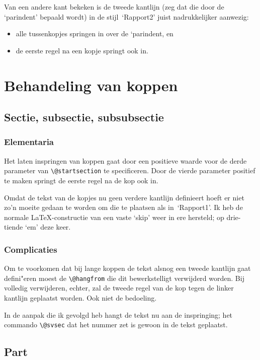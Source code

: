 \documentclass[oldtoc,a4paper,10pt]{rapport3}
\begin{document}
Van een andere kant bekeken is de tweede kantlijn (zeg dat die door de
`parindent' bepaald wordt) in de stijl~`Rapport2' juist nadrukkelijker
aanwezig:
\begin{itemize}
\item alle tussenkopjes springen in over de `parindent, en
\item de eerste regel na een kopje springt ook in.
\end{itemize}
 
 
\section{Behandeling van koppen}
\subsection{Sectie, subsectie, subsubsectie}
\subsubsection{Elementaria}
 
Het laten inspringen van koppen gaat door een positieve waarde voor de
derde parameter van \verb.\@startsection.  te specificeren. Door de
vierde parameter positief te maken springt de eerste regel na de kop
ook in.
 
Omdat de tekst van de kopjes nu geen verdere kantlijn definieert hoeft
er niet zo'n moeite gedaan te worden om die te plaatsen als
in~`Rapport1'. Ik heb de normale \LaTeX-constructie van een vaste
`skip' weer in ere hersteld; op drie-tiende `em' deze keer.
 
\subsubsection{Complicaties}
 
Om te voorkomen dat bij lange koppen de tekst alsnog een tweede
kantlijn gaat defini"eren moest de \verb.\@hangfrom. die dit
bewerkstelligt verwijderd worden. Bij volledig verwijderen, echter,
zal de tweede regel van de kop tegen de linker kantlijn geplaatst
worden.  Ook niet de bedoeling.
 
In de aanpak die ik gevolgd heb hangt de tekst nu aan de inspringing;
het commando \verb.\@svsec. dat het nummer zet is gewoon in de tekst
geplaatst.
 
 
\subsection{Part}
 
\end{document}
